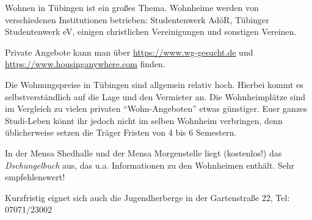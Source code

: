 Wohnen in Tübingen ist ein großes Thema.  Wohnheime werden von verschiedenen Institutionen betrieben: Studentenwerk AdöR, Tübinger Studentenwerk eV, einigen christlichen Vereinigungen und sonstigen Vereinen. 

Private Angebote kann man über \url{https://www.wg-gesucht.de} und \url{https://www.housinganywhere.com} finden.	%

Die Wohnungspreise in Tübingen sind allgemein relativ hoch. Hierbei kommt es selbstverständlich auf die Lage und den Vermieter an. Die Wohnheimplätze sind im Vergleich zu vielen privaten "`Wohn-Angeboten"' etwas günstiger.  Euer ganzes Studi-Leben könnt ihr jedoch nicht im selben Wohnheim verbringen, denn üblicherweise setzen die Träger Fristen von 4 bis 6 Semestern.


In der Mensa Shedhalle und der Mensa Morgenstelle liegt (kostenlos!) das \emph{Dschungelbuch} aus, das u.a. Informationen zu den Wohnheimen enthält. Sehr empfehlenswert!

Kurzfristig eignet sich auch die Jugendherberge in der Gartenstraße 22, Tel: 07071/23002
